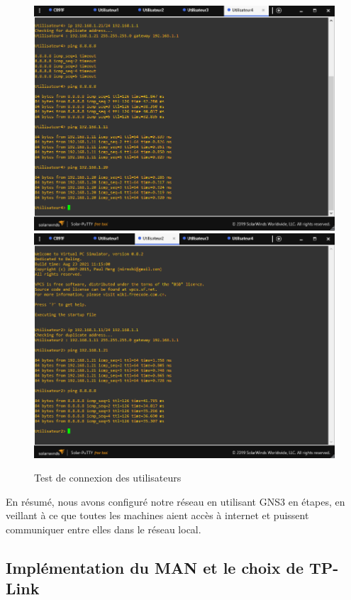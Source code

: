 \begin{figure}[H]
 \centering
    \includegraphics[width=15.5cm]{Images/BRades-Topologie8.png}
    \includegraphics[width=15.5cm]{Images/BRades-Topologie9.png}
    \caption{Test de connexion des utilisateurs}
    \label{Chap2.2.7}
\end{figure}


En résumé, nous avons configuré notre réseau en utilisant GNS3 en étapes, en veillant à ce que toutes les machines aient accès à internet et puissent communiquer entre elles dans le réseau local.


\subsection{Implémentation du MAN et le choix de TP-Link}

